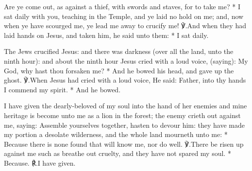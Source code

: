 \documentclass[12pt]{book}
\begin{document}



\silently


\begin{enpars}
Are ye come out, as against a thief, with swords and staves, for to take me?
* I sat daily with you, teaching in the Temple, and ye laid no hold on me; and, now when ye have scourged me, ye lead me away to crucify me!
℣.\@  And when they had laid hands on Jesus, and taken him, he said unto them:
* I sat daily.
\end{enpars}


\begin{enpars}
The Jews crucified Jesus: and there was darkness (over all the land, unto the ninth hour): and about the ninth hour Jesus cried with a loud voice, (saying): My God, why hast thou forsaken me?
* And he bowed his head, and gave up the ghost.
℣.\@  When Jesus had cried with a loud voice, He said: Father, into thy hands I commend my spirit.
* And he bowed.
\end{enpars}


\begin{enpars}
I have given the dearly-beloved of my soul into the hand of her enemies and mine heritage is become unto me as a lion in the forest; the enemy crieth out against me, saying: Assemble yourselves together, hasten to devour him: they have made my portion a desolate wilderness, and the whole land mourneth unto me:
* Because there is none found that will know me, nor do well.
℣.\@  There be risen up against me such as breathe out cruelty, and they have not spared my soul.
* Because.
℟.\@  I have given.
\end{enpars}
\end{document}
